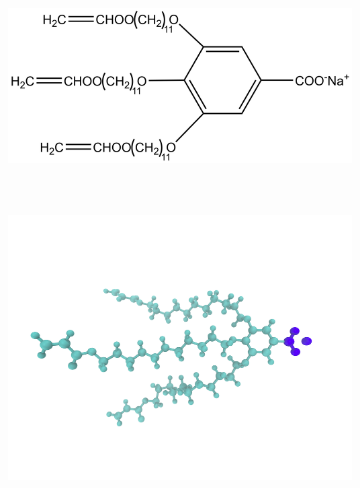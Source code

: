 \documentclass{article}
\begin{document}
  \begin{figure}
	\centering
	\begin{subfigure}{.3\textwidth}
		\centering
		\includegraphics[width=\textwidth]{NaGA3C11.png}
		\caption{}~\label{fig:monomer}
	\end{subfigure}
	\begin{subfigure}{.3\textwidth}
		\centering
		\includegraphics[width=\textwidth]{monomer_twocolor.png}
		\caption{}~\label{fig:atomistic_monomer}
	\end{subfigure}
	\begin{subfigure}{0.3\linewidth}
		\centering

\end{subfigure}
\end{figure}
\end{document}
